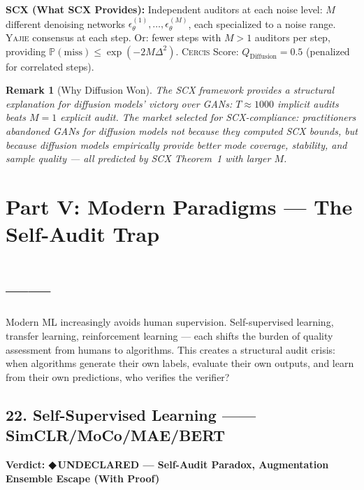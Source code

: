 \documentclass[12pt,a4paper]{article}
\newtheorem{remark}[theorem]{Remark}
\theoremstyle{definition}
\newcommand{\guilty}{{\color{guiltycolor}\textbf{◆\,UNDECLARED}}}
\newcommand{\Yajie}{\textsc{Yajie}}
\newcommand{\Cercis}{\textsc{Cercis}}
\newcommand{\SCX}{\textsc{SCX}}
\newcommand{\Pbb}{\mathbb{P}}
\newcommand{\auditHeader}[1]{\medskip\noindent\textbf{\large #1}\medskip}
\newcommand{\whatMissing}{\noindent\textbf{SCX (What SCX Provides):} }
\begin{document}
\whatMissing{} Independent auditors at each noise level: $M$ different denoising networks $\epsilon_\theta^{(1)}, \ldots, \epsilon_\theta^{(M)}$, each specialized to a noise range. \Yajie{} consensus at each step. Or: fewer steps with $M>1$ auditors per step, providing $\Pbb(\text{miss}) \le \exp(-2M\Delta^2)$. \Cercis{} Score: $Q_{\text{Diffusion}} = 0.5$ (penalized for correlated steps).

\begin{remark}[Why Diffusion Won]
The \SCX{} framework provides a structural explanation for diffusion models' victory over GANs: $T \approx 1000$ implicit audits beats $M=1$ explicit audit. The market selected for \SCX{}-compliance: practitioners abandoned GANs for diffusion models not because they computed \SCX{} bounds, but because diffusion models empirically provide better mode coverage, stability, and sample quality — all predicted by \SCX{} Theorem~1 with larger $M$.
\end{remark}

\section{Part V: Modern Paradigms — The Self-Audit Trap}
\section{——}
\label{sec:modern}

Modern ML increasingly avoids human supervision. Self-supervised learning, transfer learning, reinforcement learning — each shifts the burden of quality assessment from humans to algorithms. This creates a structural audit crisis: when algorithms generate their own labels, evaluate their own outputs, and learn from their own predictions, who verifies the verifier?

\subsection{22. Self-Supervised Learning ——SimCLR/MoCo/MAE/BERT}

\auditHeader{Verdict: \guilty{} — Self-Audit Paradox, Augmentation Ensemble Escape (With Proof)}
\end{document}
